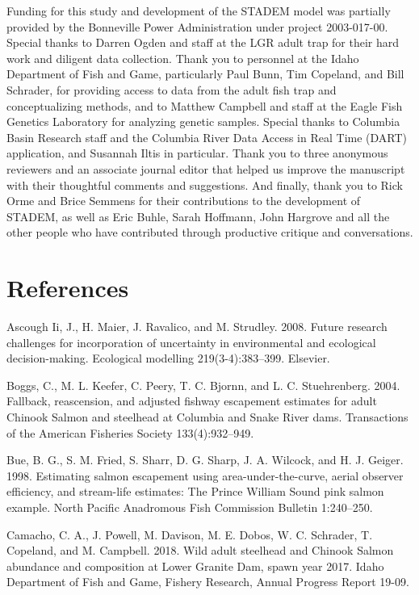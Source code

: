 \documentclass[
  12pt,
]{article}
\begin{document}
Funding for this study and development of the STADEM model was partially provided by the Bonneville Power Administration under project 2003-017-00. Special thanks to Darren Ogden and staff at the LGR adult trap for their hard work and diligent data collection. Thank you to personnel at the Idaho Department of Fish and Game, particularly Paul Bunn, Tim Copeland, and Bill Schrader, for providing access to data from the adult fish trap and conceptualizing methods, and to Matthew Campbell and staff at the Eagle Fish Genetics Laboratory for analyzing genetic samples. Special thanks to Columbia Basin Research staff and the Columbia River Data Access in Real Time (DART) application, and Susannah Iltis in particular. Thank you to three anonymous reviewers and an associate journal editor that helped us improve the manuscript with their thoughtful comments and suggestions. And finally, thank you to Rick Orme and Brice Semmens for their contributions to the development of STADEM, as well as Eric Buhle, Sarah Hoffmann, John Hargrove and all the other people who have contributed through productive critique and conversations.

\newpage

\hypertarget{references}{%
\section{References}\label{references}}

\hypertarget{refs}{}
\leavevmode\hypertarget{ref-Ascough-Ii2008}{}%
Ascough Ii, J., H. Maier, J. Ravalico, and M. Strudley. 2008. Future research challenges for incorporation of uncertainty in environmental and ecological decision-making. Ecological modelling 219(3-4):383--399. Elsevier.

\leavevmode\hypertarget{ref-Boggs2004}{}%
Boggs, C., M. L. Keefer, C. Peery, T. C. Bjornn, and L. C. Stuehrenberg. 2004. Fallback, reascension, and adjusted fishway escapement estimates for adult Chinook Salmon and steelhead at Columbia and Snake River dams. Transactions of the American Fisheries Society 133(4):932--949.

\leavevmode\hypertarget{ref-Bue1998}{}%
Bue, B. G., S. M. Fried, S. Sharr, D. G. Sharp, J. A. Wilcock, and H. J. Geiger. 1998. Estimating salmon escapement using area-under-the-curve, aerial observer efficiency, and stream-life estimates: The Prince William Sound pink salmon example. North Pacific Anadromous Fish Commission Bulletin 1:240--250.

\leavevmode\hypertarget{ref-Camacho2018}{}%
Camacho, C. A., J. Powell, M. Davison, M. E. Dobos, W. C. Schrader, T. Copeland, and M. Campbell. 2018. Wild adult steelhead and Chinook Salmon abundance and composition at Lower Granite Dam, spawn year 2017. Idaho Department of Fish and Game, Fishery Research, Annual Progress Report 19-09.
\end{document}
